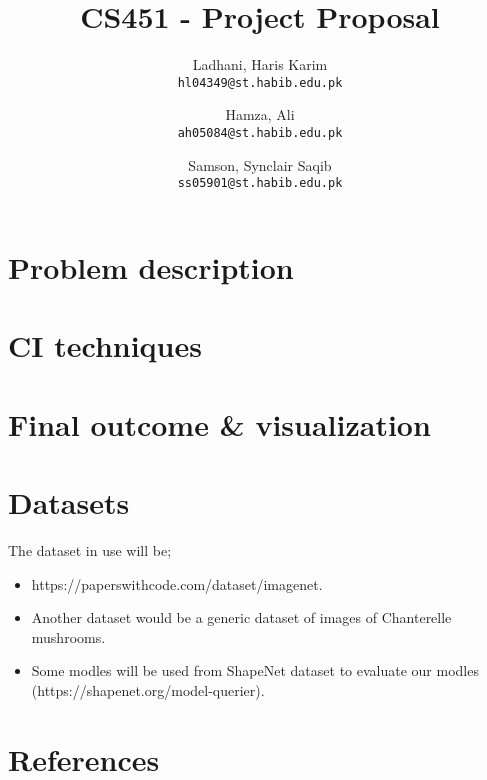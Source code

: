 \documentclass[11pt,letterpaper]{article}
\newcommand{\bibent}{\noindent \hangindent 40pt}
\newenvironment{reference}{\newpage \section*{References} }{\newpage }
\begin{document}
\title{CS451 - Project Proposal}
\author{Ladhani, Haris Karim\\
\texttt{hl04349@st.habib.edu.pk}
\and
Hamza, Ali\\
\texttt{ah05084@st.habib.edu.pk}
\and
Samson, Synclair Saqib\\
\texttt{ss05901@st.habib.edu.pk}
}
\maketitle


\section*{Problem description}


\section*{CI techniques}


\section*{Final outcome \& visualization}


\section*{Datasets} 
The dataset in use will be;
\begin{itemize}
    \item https://paperswithcode.com/dataset/imagenet.
    \item Another dataset would be a generic dataset of images of Chanterelle mushrooms.
    \item Some modles will be used from ShapeNet dataset to evaluate our modles (https://shapenet.org/model-querier).
\end{itemize}

\begin{reference}
  \bibent

\end{reference}
\end{document}
